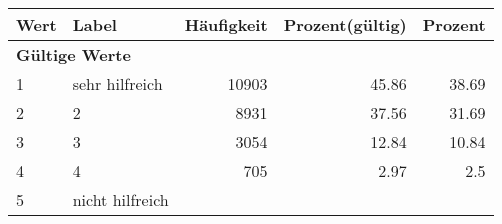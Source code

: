     \begin{longtable}{lXrrr}
     \toprule
     \textbf{Wert} & \textbf{Label} & \textbf{Häufigkeit} & \textbf{Prozent(gültig)} & \textbf{Prozent} \\
     \endhead
     \midrule
     \multicolumn{5}{l}{\textbf{Gültige Werte}}\\

     1 &
     \multicolumn{1}{X}{ sehr hilfreich   } &


       \num{10903} &
       \num[round-mode=places,round-precision=2]{45.86} &
         \num[round-mode=places,round-precision=2]{38.69} \\

     2 &
     \multicolumn{1}{X}{ 2   } &


       \num{8931} &
       \num[round-mode=places,round-precision=2]{37.56} &
         \num[round-mode=places,round-precision=2]{31.69} \\

     3 &
     \multicolumn{1}{X}{ 3   } &


       \num{3054} &
       \num[round-mode=places,round-precision=2]{12.84} &
         \num[round-mode=places,round-precision=2]{10.84} \\

     4 &
     \multicolumn{1}{X}{ 4   } &


       \num{705} &
       \num[round-mode=places,round-precision=2]{2.97} &
         \num[round-mode=places,round-precision=2]{2.5} \\

     5 &
     \multicolumn{1}{X}{ nicht hilfreich   } &



\end{longtable}
